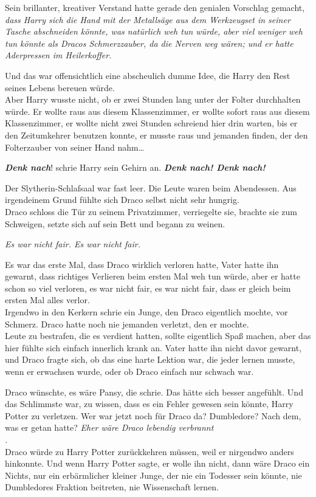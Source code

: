 {Sein brillanter, kreativer Verstand hatte gerade den genialen Vorschlag gemacht, \emph{dass Harry sich die Hand mit der Metallsäge aus dem Werkzeugset in seiner Tasche abschneiden könnte, was natürlich weh tun würde, aber viel weniger weh tun könnte als Dracos Schmerzzauber, da die Nerven weg wären; und er hatte Aderpressen im Heilerkoffer.}

Und das war offensichtlich eine abscheulich dumme Idee, die Harry den Rest seines Lebens bereuen würde.\\ Aber Harry wusste nicht, ob er zwei Stunden lang unter der Folter durchhalten würde. Er wollte raus aus diesem Klassenzimmer, er wollte sofort raus aus diesem Klassenzimmer, er wollte nicht zwei Stunden schreiend hier drin warten, bis er den Zeitumkehrer benutzen konnte, er musste raus und jemanden finden, der den Folterzauber von seiner Hand nahm…

\textbf{\emph{Denk nach}}! schrie Harry sein Gehirn an. \textbf{\emph{Denk nach! Denk nach!}}

Der Slytherin-Schlafsaal war fast leer. Die Leute waren beim Abendessen. Aus irgendeinem Grund fühlte sich Draco selbst nicht sehr hungrig.\\ Draco schloss die Tür zu seinem Privatzimmer, verriegelte sie, brachte sie zum Schweigen, setzte sich auf sein Bett und begann zu weinen.

\emph{Es war nicht fair. Es war nicht fair.}

Es war das erste Mal, dass Draco wirklich verloren hatte, Vater hatte ihn gewarnt, dass richtiges Verlieren beim ersten Mal weh tun würde, aber er hatte schon so viel verloren, es war nicht fair, es war nicht fair, dass er gleich beim ersten Mal alles verlor.\\ Irgendwo in den Kerkern schrie ein Junge, den Draco eigentlich mochte, vor Schmerz. Draco hatte noch nie jemanden verletzt, den er mochte.\\ Leute zu bestrafen, die es verdient hatten, sollte eigentlich Spaß machen, aber das hier fühlte sich einfach innerlich krank an. Vater hatte ihn nicht davor gewarnt, und Draco fragte sich, ob das eine harte Lektion war, die jeder lernen musste, wenn er erwachsen wurde, oder ob Draco einfach nur schwach war.

Draco wünschte, es wäre Pansy, die schrie. Das hätte sich besser angefühlt. Und das Schlimmste war, zu wissen, dass es ein Fehler gewesen sein könnte, Harry Potter zu verletzen. Wer war jetzt noch für Draco da? Dumbledore? Nach dem, was er getan hatte? \emph{Eher wäre Draco lebendig verbrannt}\\ \emph{.}\\ Draco würde zu Harry Potter zurückkehren müssen, weil er nirgendwo anders hinkonnte. Und wenn Harry Potter sagte, er wolle ihn nicht, dann wäre Draco ein Nichts, nur ein erbärmlicher kleiner Junge, der nie ein Todesser sein könnte, nie Dumbledores Fraktion beitreten, nie Wissenschaft lernen.

}
